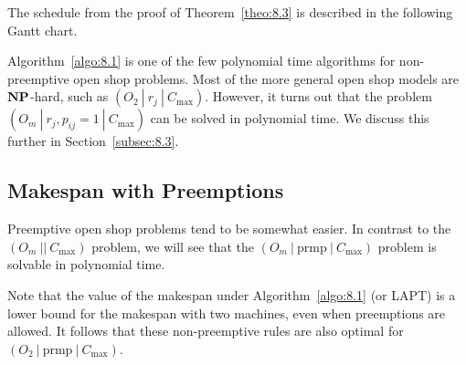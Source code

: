 The schedule from the proof of Theorem~\ref{theo:8.3} is described 
in the following Gantt chart. 
\begin{center}
\end{center}   
\vspace{-0.4cm}
Algorithm~\ref{algo:8.1} is one of the few polynomial time algorithms 
for non-preemptive open shop problems. Most of the more general open shop 
models are $\operatorname{\textbf{NP}}$-hard, such as $(O_2~|~r_j~|~C_{\max})$. However, it turns 
out that the problem $(O_m~|~r_j, p_{ij} = 1~|~C_{\max})$ can be solved 
in polynomial time. We discuss this further in Section~\ref{subsec:8.3}. 

\subsection{Makespan with Preemptions} \label{subsec:8.2} 
Preemptive open shop problems tend to be somewhat easier. In contrast 
to the $(O_m~||~C_{\max})$ problem, we will see that the 
$(O_m~|~\text{prmp}~|~C_{\max})$ problem is solvable in polynomial time. 

Note that the value of the makespan under Algorithm~\ref{algo:8.1} 
(or LAPT) is a lower bound for the makespan with two machines, 
even when preemptions are allowed. It follows that these non-preemptive 
rules are also optimal for $(O_2~|~\text{prmp}~|~C_{\max})$. 

